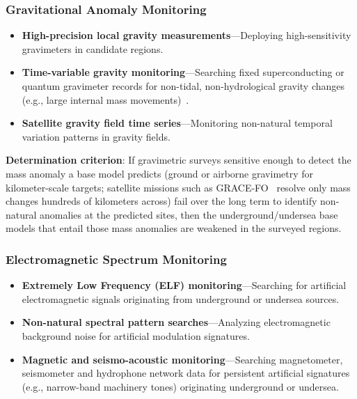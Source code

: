 \documentclass[aps,prd,twocolumn,superscriptaddress,nofootinbib]{revtex4-2}
\begin{document}
\subsubsection{Gravitational Anomaly Monitoring}\label{sec:grav-monitoring}

\begin{itemize}
  \item \textbf{High-precision local gravity measurements}---Deploying high-sensitivity gravimeters in candidate regions.
  \item \textbf{Time-variable gravity monitoring}---Searching fixed superconducting or quantum gravimeter records for non-tidal, non-hydrological gravity changes (e.g., large internal mass movements)~\cite{Cooke2021}.
  \item \textbf{Satellite gravity field time series}---Monitoring non-natural temporal variation patterns in gravity fields.
\end{itemize}

\textbf{Determination criterion}: If gravimetric surveys sensitive enough to detect the mass anomaly a base model predicts (ground or airborne gravimetry for kilometer-scale targets; satellite missions such as GRACE-FO~\cite{NASA_GRACEFO} resolve only mass changes hundreds of kilometers across) fail over the long term to identify non-natural anomalies at the predicted sites, then the underground/undersea base models that entail those mass anomalies are weakened in the surveyed regions.

\subsubsection{Electromagnetic Spectrum Monitoring}\label{sec:em-monitoring}

\begin{itemize}
  \item \textbf{Extremely Low Frequency (ELF) monitoring}---Searching for artificial electromagnetic signals originating from underground or undersea sources.
  \item \textbf{Non-natural spectral pattern searches}---Analyzing electromagnetic background noise for artificial modulation signatures.
  \item \textbf{Magnetic and seismo-acoustic monitoring}---Searching magnetometer, seismometer and hydrophone network data for persistent artificial signatures (e.g., narrow-band machinery tones) originating underground or undersea.
\end{itemize}
\end{document}
